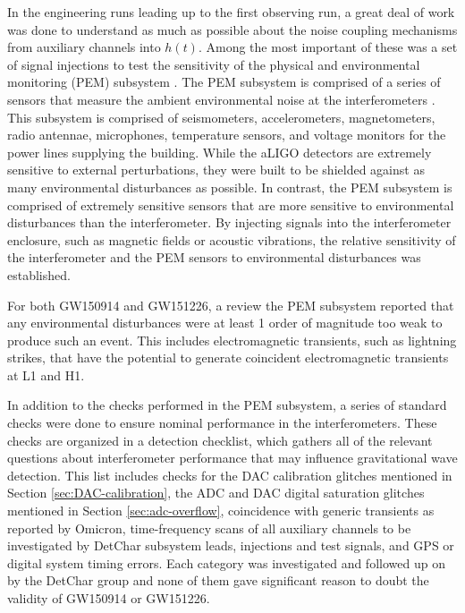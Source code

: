 In the engineering runs leading up to the first observing run, a great deal of 
work was done to understand as much as possible about the noise coupling mechanisms 
from auxiliary channels into $h(t)$. Among the most important of these was a set 
of signal injections to test the sensitivity of the physical and environmental 
monitoring (PEM) subsystem \cite{GW150914-DETCHAR}. 
The PEM subsystem is comprised of a series of sensors 
that measure the ambient environmental noise at the interferometers 
\cite{Effler:2014zpa}. This 
subsystem is comprised of seismometers, accelerometers, magnetometers, radio 
antennae, microphones, temperature sensors, and voltage monitors for the power 
lines supplying the building. While the aLIGO detectors are extremely sensitive 
to external perturbations, they were built to be shielded against as many 
environmental disturbances as possible. In contrast, the PEM subsystem is comprised 
of extremely sensitive sensors that are more sensitive to environmental disturbances 
than the interferometer. By injecting signals into the interferometer enclosure, 
such as magnetic fields or acoustic vibrations, the relative sensitivity of the 
interferometer and the PEM sensors to environmental disturbances was established.

For both GW150914 and GW151226, a review the PEM subsystem reported that any environmental 
disturbances were at least 1 order of magnitude too weak to produce such an event. 
This includes electromagnetic transients, such as lightning strikes, that have the 
potential to generate coincident electromagnetic transients at L1 and H1. 

In addition to the checks performed in the PEM subsystem, a series of standard 
checks were done to ensure nominal performance in the interferometers. These 
checks are organized in a detection checklist, which gathers all of the 
relevant questions about interferometer performance that may influence 
gravitational wave detection. This list includes checks 
for the DAC calibration glitches mentioned in Section \ref{sec:DAC-calibration}, 
the ADC and DAC 
digital saturation glitches mentioned in Section \ref{sec:adc-overflow}, coincidence with 
generic transients 
as reported by Omicron, time-frequency scans of all auxiliary channels to be 
investigated by DetChar subsystem leads, injections and test signals, and 
GPS or digital system timing errors. Each category was investigated and 
followed up on by the DetChar group and none of them gave significant 
reason to doubt the validity of GW150914 or GW151226.  

